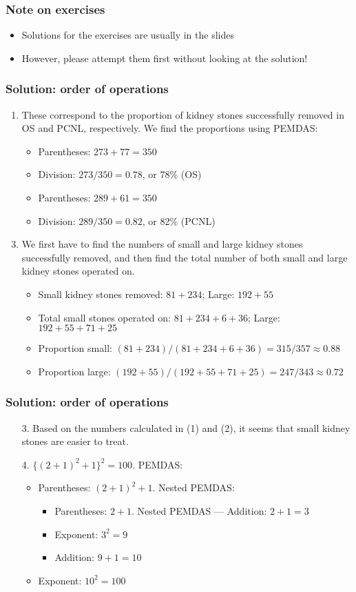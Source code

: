 \documentclass[11pt]{beamer}
\newcommand{\myframe}[1]{\begin{frame} \frametitle{#1}}
\begin{document}
\myframe{Note on exercises}
\begin{itemize}
\item Solutions for the exercises are usually in the slides
\item[]
\item However, please attempt them first without looking at the solution!
\end{itemize}
\end{frame}

\myframe{Solution: order of operations}
\begin{enumerate}
\item These correspond to the proportion of kidney stones successfully removed in OS and PCNL, respectively. We find the proportions using PEMDAS:
\begin{itemize}
\item Parentheses: $273+77 = 350$
\item Division: $273/350 = 0.78$, or 78\% (OS)
\item Parentheses: $289+61 = 350$
\item Division: $289/350 = 0.82$, or 82\% (PCNL)
\end{itemize}
\item[]
\item We first have to find the numbers of small and large kidney stones successfully removed, and then find the total number of both small and large kidney stones operated on.
\begin{itemize}
\item Small kidney stones removed: $81+234$; Large: $192+55$
\item Total small stones operated on: $81+234+6+36$; Large: $192+55+71+25$
\item Proportion small: $(81+234)/(81+234+6+36) = 315/357 \approx 0.88$
\item Proportion large: $(192+55)/(192+55+71+25) = 247/343 \approx 0.72$
\end{itemize}
\end{enumerate}
\end{frame}

\myframe{Solution: order of operations}
\begin{enumerate}
\item[3.] Based on the numbers calculated in (1) and (2), it seems that small kidney stones are easier to treat.
\item[]
\item[4.] $\{(2+1)^2 + 1\}^2 = 100$. PEMDAS:
\begin{itemize}
\item Parentheses: $(2 + 1)^2 + 1$. Nested PEMDAS:
\begin{itemize}
\item Parentheses: $2 + 1$. Nested PEMDAS --- Addition: $2 + 1 = 3$
\item Exponent: $3^2 = 9$ 
\item Addition: $9 + 1 = 10$
\end{itemize}
\item Exponent: $10^2 = 100$
\end{itemize}
\end{enumerate}
\end{frame}
\end{document}

